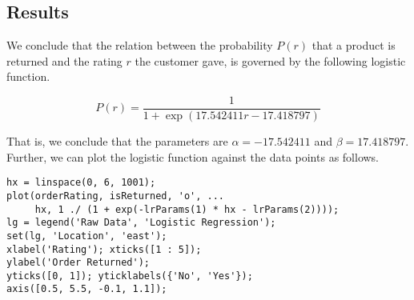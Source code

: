 \subsection{Results}

We conclude that the relation between the probability $P(r)$ that a product is returned and the rating $r$ the customer gave, is governed by the following logistic function.

$$P(r) = \frac{1}{1 + \exp(17.542411 r - 17.418797)}$$

\noindent
That is, we conclude that the parameters are $\alpha = -17.542411$ and $\beta = 17.418797$. Further, we can plot the logistic function against the data points as follows.

\begin{lstlisting}
hx = linspace(0, 6, 1001);
plot(orderRating, isReturned, 'o', ...
     hx, 1 ./ (1 + exp(-lrParams(1) * hx - lrParams(2))));
lg = legend('Raw Data', 'Logistic Regression');
set(lg, 'Location', 'east');
xlabel('Rating'); xticks([1 : 5]);
ylabel('Order Returned');
yticks([0, 1]); yticklabels({'No', 'Yes'});
axis([0.5, 5.5, -0.1, 1.1]);
\end{lstlisting}
